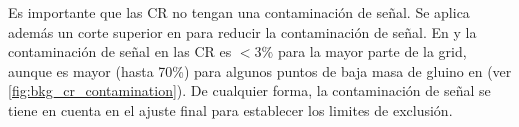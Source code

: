 
Es importante que las CR no tengan una contaminación de señal. Se aplica además
un corte superior en {\met} para reducir la contaminación de señal. En {\CRW} y
{\CRT} la contaminación de señal en las CR es $<3\%$ para la mayor parte de la
grid, aunque es mayor (hasta 70\%) para algunos puntos de baja masa de gluino en
{\CRTL} (ver \cref{fig:bkg_cr_contamination}). De cualquier forma, la
contaminación de señal se tiene en cuenta en el ajuste final para establecer los
limites de exclusión.


